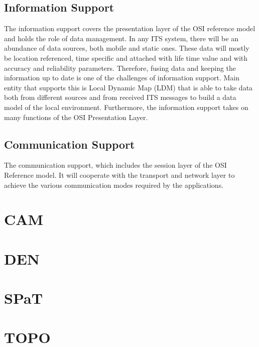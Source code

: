 \subsection{Information Support}
The information support covers the presentation layer of the OSI reference model and holds the role of
data management. In any ITS system, there will be an abundance of data sources, both mobile and static
ones. These data will mostly be location referenced, time specific and attached with life time value and
with accuracy and reliability parameters. Therefore, fusing data and keeping the information up to date is
one of the challenges of information support. Main entity that supports this is Local Dynamic
Map (LDM) that is able to take data both from different sources and from received ITS messages to build
a data model of the local environment. Furthermore, the information support takes on many functions of
the OSI Presentation Layer. 

\subsection{Communication Support}
The communication support, which includes the session layer of the OSI Reference model. It will
cooperate with the transport and network layer to achieve the various communication modes required by
the applications. 

\section{CAM\label{sec:cam}}

\section{DEN\label{sec:den}}


\section{SPaT\label{sec:spat}}

\section{TOPO\label{sec:topo}}
